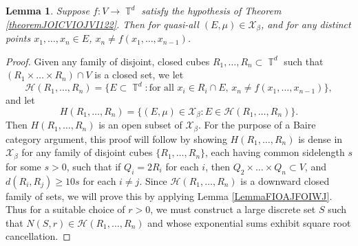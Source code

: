 \documentclass[dvipsnames,letterpaper,12pt]{article}
\numberwithin{equation}{section}
\DeclareMathOperator{\TT}{\mathbb{T}}
\newtheorem{lemma}[theorem]{Lemma}
\numberwithin{theorem}{section}
\begin{document}
\begin{lemma} \label{lemmaOIOICJOIJOISJOIJS}
    Suppose $f: V \to \TT^d$ satisfy the hypothesis of Theorem \ref{theoremJOICVIOJVI122}. Then for quasi-all $(E,\mu) \in \mathcal{X}_\beta$, and for any distinct points $x_1,\dots,x_n \in E$, $x_n \neq f(x_1,\dots,x_{n-1})$.
\end{lemma}
\begin{proof}
    Given any family of disjoint, closed cubes $R_1,\dots,R_n \subset \TT^d$ such that $(R_1 \times \dots \times R_n) \cap V$ is a closed set, we let
    \[ \mathcal{H}(R_1,\dots,R_n) = \{ E \subset \TT^d: \text{for all $x_i \in R_i \cap E$, $x_n \neq f(x_1,\dots,x_{n-1})$} \}, \]
    and let
    \[ H(R_1,\dots,R_n) = \{ (E,\mu) \in \mathcal{X}_\beta: E \in \mathcal{H}(R_1,\dots,R_n) \}. \]
    Then $H(R_1,\dots,R_n)$ is an open subset of $\mathcal{X}_\beta$. For the purpose of a Baire category argument, this proof will follow by showing $H(R_1,\dots,R_n)$ is dense in $\mathcal{X}_\beta$ for any family of disjoint cubes $\{ R_1,\dots, R_n \}$, each having common sidelength $s$ for some $s > 0$, such that if $Q_i = 2R_i$ for each $i$, then $Q_2 \times \dots \times Q_n \subset V$, and $d(R_i,R_j) \geq 10s$ for each $i \neq j$. Since $\mathcal{H}(R_1,\dots,R_n)$ is a downward closed family of sets, we will prove this by applying Lemma \ref{LemmaFIOAJFOIWJ}. Thus for a suitable choice of $r > 0$, we must construct a large discrete set $S$ such that $N(S,r) \in \mathcal{H}(R_1,\dots,R_n)$ and whose exponential sums exhibit square root cancellation.


\end{proof}
\end{document}
